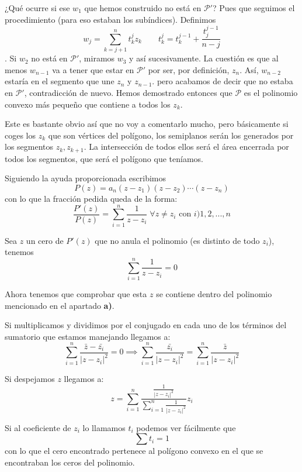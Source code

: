 \begin{problem}[4]
¿Qué ocurre si ese $w_1$ que hemos construido no está en $\mathcal{P}'$? Pues que seguimos el procedimiento (para eso estaban los subíndices). Definimos \[ w_j = \sum_{k=j + 1}^n t_k^j z_k\qquad t_k^j = t_k^{j-1} + \frac{t_j^{j-1}}{n - j} \]. Si $w_2$ no está en $\mathcal{P}'$, miramos $w_3$ y así sucesivamente. La cuestión es que al menos $w_{n-1}$ va a tener que estar en $\mathcal{P}'$ por ser, por definición, $z_n$. Así, $w_{n-2}$ estaría en el segmento que une $z_n$ y $z_{n-1}$. pero acabamos de decir que no estaba en $\mathcal{P}'$, contradicción de nuevo. Hemos demostrado entonces que $\mathcal{P}$ es el polinomio convexo más pequeño que contiene a todos los $z_k$.

\spart

Este es bastante obvio así que no voy a comentarlo mucho, pero básicamente si coges los $z_k$ que son vértices del polígono, los semiplanos serán los generados por los segmentos $z_k, z_{k+1}$. La intersección de todos ellos será el área encerrada por todos los segmentos, que será el polígono que teníamos.

\spart
Siguiendo la ayuda proporcionada escribimos
\[P(z)=a_n(z-z_1)(z-z_2)\cdots (z-z_n)\]
con lo que la fracción pedida queda de la forma:
\[\frac{P'(z)}{P(z)}=\sum_{i=1}^n \frac{1}{z-z_i} \; \forall z \neq z_i \text{ con } i)1,2,...,n\]

Sea $z$ un cero de $P'(z)$ que no anula el polinomio (es distinto de todo $z_i$), tenemos
\[\sum_{i=1}^n \frac{1}{z-z_i}=0\]

Ahora tenemos que comprobar que esta $z$ se contiene dentro del polinomio mencionado en el apartado \textbf{a)}.

Si multiplicamos y dividimos por el conjugado en cada uno de los términos del sumatorio que estamos manejando llegamos a:
\[\sum_{i=1}^n \frac{\bar{z}-\bar{z_i}}{|z-z_i|^2} = 0 \implies  \sum_{i=1}^n \frac{\bar{z_i}}{|z-z_i|^2} = \sum_{i=1}^n \frac{\bar{z}}{|z-z_i|^2}  \]

Si despejamos $z$ llegamos a:
\[z= \sum_{i=1}^n \frac{\frac{1}{|z-z_i|^2}}{\sum_{i=1}^n \frac{1}{|z-z_i|^2}}z_i\]

Si al coeficiente de $z_i$ lo llamamos $t_i$ podemos ver fácilmente que
\[\sum t_i = 1\]
con lo que el cero encontrado pertenece al polígono convexo en el que se encontraban los ceros del polinomio.
\end{problem}


